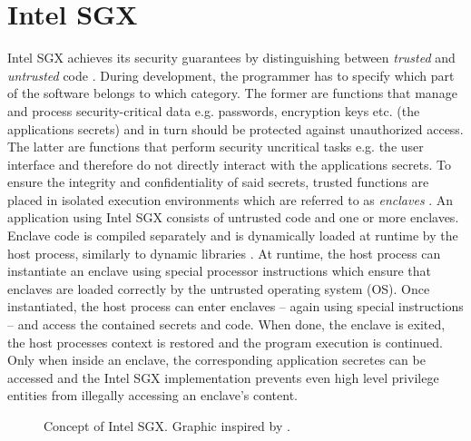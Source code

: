 \section{Intel SGX}
Intel SGX achieves its security guarantees by distinguishing between \textit{trusted} and \textit{untrusted} code \cite{IntelWebBasedTraining}. During development,
the programmer has to specify which part of the software belongs to which category. The former are functions that manage and process security-critical data e.g. passwords,
encryption keys etc. (the applications secrets) and in turn should be protected against unauthorized access. The latter are functions that perform security uncritical 
tasks e.g. the user interface and therefore do not directly interact with the applications secrets. To ensure the integrity and confidentiality of said secrets, trusted 
functions are placed in isolated execution environments which are referred to as \textit{enclaves} \cite{UseOfIntelSGX}. An application using Intel SGX consists of untrusted 
code and one or more enclaves. Enclave code is compiled separately and is dynamically loaded at runtime by the host process, similarly to dynamic libraries \cite{Costan2016IntelSE}.
At runtime, the host process can instantiate an enclave using special processor instructions which ensure that enclaves are loaded correctly by the untrusted operating system
(OS). Once instantiated, the host process can enter enclaves -- again using special instructions -- and access the contained secrets and code. When done, the enclave is exited,
the host processes context is restored and the program execution is continued. Only when inside an enclave, the corresponding application secretes can be accessed and the
Intel SGX implementation prevents even high level privilege entities from illegally accessing an enclave's content.
\begin{figure}[h!]
    \centering
    \caption{Concept of Intel SGX. Graphic inspired by \cite{IntelSGXExplanation}.}
    \label{fig:enclaveCall}
\end{figure}




